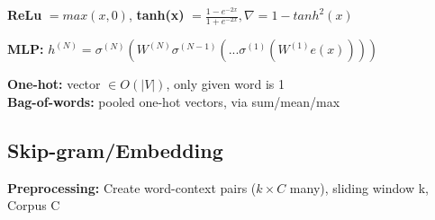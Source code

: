 \textbf{ReLu} $=max(x,0)$, \textbf{tanh(x)} $=\frac{1-e^{-2x}}{1+e^{-2x}}, \nabla = 1-tanh^2(x)$\\
\begin{comment}
	Sigmoid and tanh have the vanishing gradient problem. If values are really large are really small, the value of the gradient approaches 0. 
	This then propagates through the NN, since all the gradients are dependent on each other.\\
\end{comment} 

\begin{comment}
	Key idea of a Neural Network is, that it can learn the feature function jointly with the parameters.
	If we define special g(.) to learn non-linear shapes with the log-linear model, we need to know the shape a-priori.\\
\end{comment} 

\textbf{MLP:} $h^{(N)} = \sigma^{(N)}(W^{(N)}\sigma^{(N-1)}(...\sigma^{(1)}(W^{(1)}e(x))))$\\
\begin{comment}
	Stacking of linear models combined with non-linearities. We need the non-linearities to gain predictive power over non-linear decision boundaries.\\
\end{comment} 

\textbf{One-hot:} vector $\in O(|V|)$, only given word is 1\\
\textbf{Bag-of-words:} pooled one-hot vectors, via sum/mean/max\\
\begin{comment}
	The process of creating a bag-of-words is called pooling. Can pool by summing up, taking the mean or taking the max everywhere.\\
	n-grams can be encoded this way, but the vectors get huge, since every combination needs a slot.\\
\end{comment} 

\subsection{Skip-gram/Embedding}
\begin{comment}
	We assume to have a large sentencised and tokenized corpus.
	From there, we create word-context pairs using a window. This process takes linear time.\\
\end{comment} 
\textbf{Preprocessing:} Create word-context pairs ($k\times C$ many), sliding window k, Corpus C\\
\begin{comment}
	k=Window size, C=Corpus size\\
	We slide over the corpus and create the pairs of words within the given window.\\
\end{comment} 

